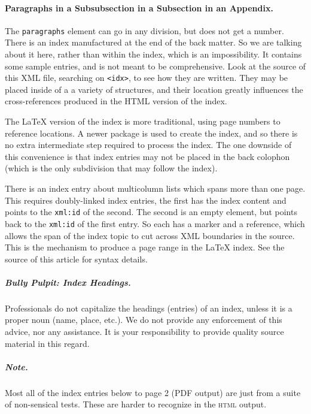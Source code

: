 \documentclass[pdflatex]{sn-jnl}
\theoremstyle{thmstyleone}%
\theoremstyle{thmstyletwo}%
\theoremstyle{thmstylethree}%
\newcommand{\mono}[1]{\texttt{#1}}
\newcommand{\initialism}[1]{\textsc{\MakeLowercase{#1}}}
\numberwithin{equation}{section}
\begin{document}
\begin{appendices}
\paragraph*{Paragraphs in a Subsubsection in a Subsection in an Appendix.}\label{appendix-structured-3-3-3}%
The \mono{paragraphs} element can go in any division, but does not get a number.%
%
%
\typeout{************************************************}
\typeout{************************************************}
%
\label{appendix-index}%
There is an index manufactured at the end of the back matter.  So we are talking about it here, rather than within the index, which is an impossibility.  It contains some sample entries, and is not meant to be comprehensive.  Look at the source of this XML file, searching on \mono{<idx>}, to see how they are written.  They may be placed inside of a a variety of structures, and their location greatly influences the cross-references produced in the HTML version of the index.%
\par
The \LaTeX{} version of the index is more traditional, using page numbers to reference locations.  A newer package is used to create the index, and so there is no extra intermediate step required to process the index.  The one downside of this convenience is that index entries may not be placed in the back colophon (which is the only subdivision that may follow the index).%
\par
There is an index entry about multicolumn lists which spans more than one page.  This requires doubly-linked index entries, the first has the index content and points to the \mono{xml:id} of the second.  The second is an empty element, but points back to the \mono{xml:id} of the first entry.  So each has a marker and a reference, which allows the span of the index topic to cut across XML boundaries in the source.  This is the mechanism to produce a page range in the \LaTeX{} index.  See the source of this article for syntax details.%
\subparagraph*{Bully Pulpit: Index Headings.}\label{appendix-index-5}%
Professionals do not capitalize the headings (entries) of an index, unless it is a proper noun (name, place, etc.\@).  We do not provide any enforcement of this advice, nor any assistance.  It is your responsibility to provide quality source material in this regard.%
\subparagraph*{Note.}\label{appendix-index-6}%
Most all of the index entries below to page 2 (PDF output) are just from a suite of non-sensical tests.  These are harder to recognize in the \initialism{HTML} output.%
%
%
\typeout{************************************************}
\typeout{************************************************}
%
\label{appendix-multiple-references}%
%
%
\typeout{************************************************}
\typeout{************************************************}
%

\end{appendices}
\end{document}
